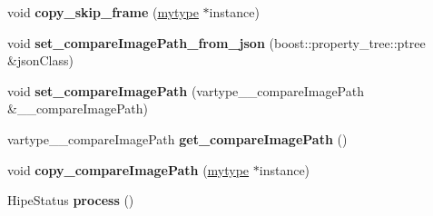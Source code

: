 \begin{DoxyCompactItemize}
\item 
\mbox{\label{classfilter_1_1algos_1_1_latch_debug_ac7cc682d4a2c8159ec44eb96bfe1fbe0}} 
void {\bfseries copy\+\_\+skip\+\_\+frame} (\hyperlink{classfilter_1_1algos_1_1_latch_debug}{mytype} $\ast$instance)
\item 
\mbox{\label{classfilter_1_1algos_1_1_latch_debug_aa0765ec9333e672c06ea7cace0f88824}} 
void {\bfseries set\+\_\+compare\+Image\+Path\+\_\+from\+\_\+json} (boost\+::property\+\_\+tree\+::ptree \&json\+Class)
\item 
\mbox{\label{classfilter_1_1algos_1_1_latch_debug_a60a65c000f9d53979cea9833db8dad93}} 
void {\bfseries set\+\_\+compare\+Image\+Path} (vartype\+\_\+\+\_\+compare\+Image\+Path \&\+\_\+\+\_\+compare\+Image\+Path)
\item 
\mbox{\label{classfilter_1_1algos_1_1_latch_debug_ad1fd28980607ff51920ded78fb382134}} 
vartype\+\_\+\+\_\+compare\+Image\+Path {\bfseries get\+\_\+compare\+Image\+Path} ()
\item 
\mbox{\label{classfilter_1_1algos_1_1_latch_debug_a7a90e3f5028c88d327deb6026987f5f3}} 
void {\bfseries copy\+\_\+compare\+Image\+Path} (\hyperlink{classfilter_1_1algos_1_1_latch_debug}{mytype} $\ast$instance)
\item 
\mbox{\label{classfilter_1_1algos_1_1_latch_debug_a58a1e8b9941660e8ddfce9c90f81e601}} 
Hipe\+Status {\bfseries process} ()
\end{DoxyCompactItemize}
